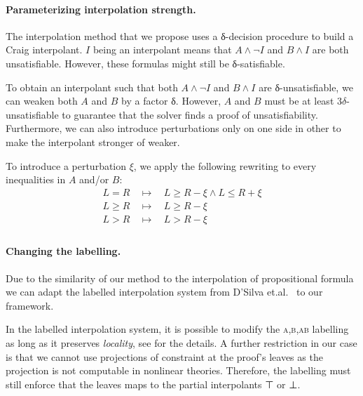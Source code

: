 \paragraph{Parameterizing interpolation strength.}

The interpolation method that we propose uses a δ-decision procedure to build a Craig interpolant.
$I$ being an interpolant means that $A ∧ ¬I$ and $B ∧ I$ are both unsatisfiable.
However, these formulas might still be δ-satisfiable.

To obtain an interpolant such that both $A ∧ ¬I$ and $B ∧ I$ are δ-unsatisfiable, we can weaken both $A$ and $B$ by a factor δ.
However, $A$ and $B$ must be at least $3δ$-unsatisfiable to guarantee that the solver finds a proof of unsatisfiability.
Furthermore, we can also introduce perturbations only on one side in other to make the interpolant stronger of weaker.

To introduce a perturbation $\xi$, we apply the following rewriting to every inequalities in $A$ and/or $B$:
\begin{eqnarray*}
L = R & ~~ \mapsto ~~ & L ≥ R - \xi ∧ L ≤ R + \xi \\
L ≥ R & ~~ \mapsto ~~ & L ≥ R - \xi \\
L > R & ~~ \mapsto ~~ & L > R - \xi \\
\end{eqnarray*}

\paragraph{Changing the labelling.}
Due to the similarity of our method to the interpolation of propositional formula we can adapt the labelled interpolation system from D'Silva et.al.~\cite{DBLP:conf/vmcai/DSilvaKPW10} to our framework.

In the labelled interpolation system, it is possible to modify the \textsc{a,b,ab} labelling as long as it preserves \emph{locality}, see \cite{DBLP:conf/vmcai/DSilvaKPW10} for the details.
A further restriction in our case is that we cannot use projections of constraint at the proof's leaves as the projection is not computable in nonlinear theories.
Therefore, the labelling must still enforce that the leaves maps to the partial interpolants ⊤ or ⊥.
